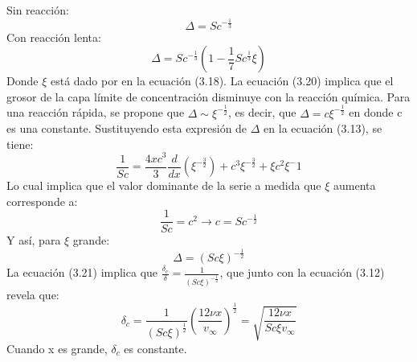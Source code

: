 Sin reacción:
\begin{equation*}
    \Delta =Sc^{-\frac{1}{3}}
\end{equation*}
Con reacción lenta:
\begin{equation}
    \Delta=Sc^{-\frac{1}{3}}(1-\frac{1}{7}Sc^{\frac{1}{3}}\xi)
\end{equation}
Donde $\xi$ está dado por en la ecuación (3.18). La ecuación (3.20) implica que el grosor de la capa límite de concentración disminuye con la reacción química.
Para una reacción rápida, se propone que $\Delta\sim \xi^{-\frac{1}{2}}$, es decir, que $\Delta=c\xi^{-\frac{1}{2}}$ en donde c es una constante. Sustituyendo esta expresión de $\Delta$ en la ecuación (3.13), se tiene:
\begin{equation*}
    \frac{1}{Sc}=\frac{4xc^3}{3}\frac{d}{dx}(\xi^{-\frac{3}{2}})+c^3\xi^{-\frac{3}{2}}+\xi c^2\xi^-1
\end{equation*}
Lo cual implica que el valor dominante de la serie a medida que $\xi$ aumenta corresponde a:
\begin{equation*}
    \frac{1}{Sc}=c^2\rightarrow c=Sc^{-\frac{1}{2}}
\end{equation*}
Y así, para $\xi$ grande:
\begin{equation}
    \Delta=(Sc\xi)^{-\frac{1}{2}}
\end{equation}
La ecuación (3.21) implica que $\frac{\delta_c}{\delta}=\frac{1}{(Sc\xi)^{-\frac{1}{2}}}$, que junto con la ecuación (3.12) revela que:
\begin{equation*}
    \delta_c=\frac{1}{(Sc\xi)^{\frac{1}{2}}}(\frac{12\nu x}{v_\infty})^{\frac{1}{2}}=\sqrt{\frac{12\nu x}{Sc\xi v_\infty}}
\end{equation*}
Cuando x es grande, $\delta_c$ es constante.
